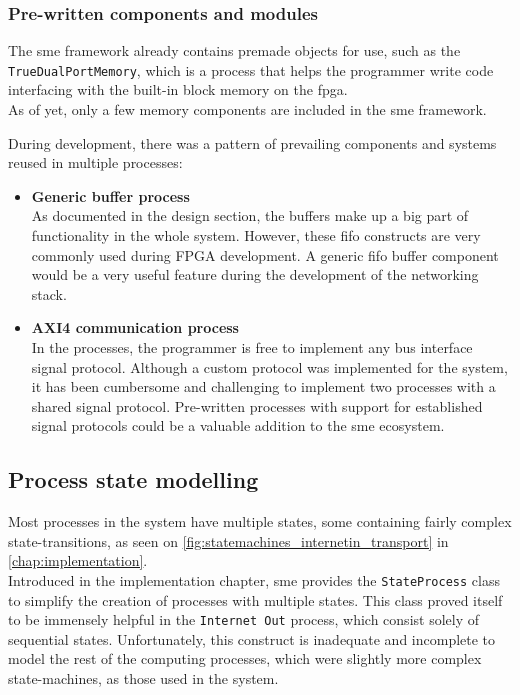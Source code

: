 \subsubsection{Pre-written components and modules}
The \gls{sme} framework already contains premade objects for use, such as the
\texttt{TrueDualPortMemory}, which is a process that helps the programmer write
code interfacing with the built-in block memory on the \gls{fpga}.\\
As of yet, only a few memory components are included in the \gls{sme}
framework.

During development, there was a pattern of prevailing components and systems
reused in multiple processes:
\begin{itemize}
\item \textbf{Generic buffer process}\\
As documented in the design section, the buffers make up a big part of
functionality in the whole system. However, these \gls{fifo} constructs
are very commonly used during FPGA development\cite{fpga_fifo}. A generic
\gls{fifo} buffer component would be a very useful feature during the
development of the networking stack.

\item \textbf{AXI4 communication process}\\
In the processes, the programmer is free to implement any bus interface signal
protocol. Although a custom protocol was implemented for the system, it has
been cumbersome and challenging to implement two processes with a shared signal
protocol. Pre-written processes with support for established signal protocols
could be a valuable addition to the \gls{sme} ecosystem.

\end{itemize}


\subsection{Process state modelling}
Most processes in the system have multiple states, some containing fairly
complex state-transitions, as seen on \autoref{fig:statemachines_internetin_transport}
in \autoref{chap:implementation}.\\
Introduced in the implementation chapter, \gls{sme} provides the
\texttt{StateProcess} class to simplify the creation of processes with
multiple states. This class proved itself to be immensely helpful in the
\texttt{Internet Out} process, which consist solely of sequential states.
Unfortunately, this construct is inadequate and incomplete to model the rest of
the computing processes, which were slightly more complex state-machines, as
those used in the system.

